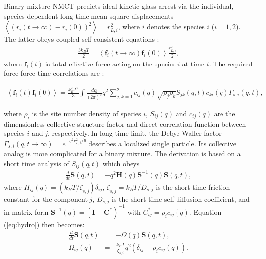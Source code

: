 \documentclass[twocolumn,showpacs,preprintnumbers,amsmath,amssymb,unsortedaddress,
]{revtex4-1}
\begin{document}
Binary mixture NMCT predicts ideal kinetic glass arrest via the individual, species-dependent long time mean-square displacements    $\left\langle (r_i(t\rightarrow \infty)-r_i(0))^2\right\rangle = r_{L,i}^2$, where $i$ denotes the species $i$ ($i=1,2$). The latter obeys coupled self-consistent equations \cite{34}:
\begin{eqnarray}
\frac{3k_BT}{2} = \left\langle \mathbf{f}_{i}(t\rightarrow \infty)\mathbf{f}_{i}(0) \right\rangle \frac{r_{L,i}^2}{2},
\label{eq:NMCT}
\end{eqnarray}
where $\mathbf{f}_{i}(t)$ is total effective force acting on the species $i$ at time $t$. The required force-force time correlations are \cite{34}:
\begin{widetext}
\begin{eqnarray}
\left\langle \mathbf{f}_{i}(t)\mathbf{f}_{i}(0) \right\rangle = \frac{k_B^2T^2}{3}\int\frac{d\mathbf{q}}{(2\pi)^3}q^2\sum_{j,k=1}^{2}c_{ij}(q)\sqrt{\rho_j\rho_k}S_{jk}(q,t)c_{ki}(q)\Gamma_{s,i}(q,t),
\label{eq:force-force}
\end{eqnarray}
\end{widetext}
where $\rho_i$ is the site number density of species $i$, $S_{ij}(q)$ and $c_{ij}(q)$ are the dimensionless collective structure factor and direct correlation function between species $i$ and $j$, respectively. In long time limit, the Debye-Waller factor $\Gamma_{s,i}(q,t\rightarrow \infty) = e^{-q^2r_{L,i}^2/6}$ describes a localized single particle. Its collective analog is more complicated for a binary mixture. The derivation is based on a short time analysis of $S_{ij}(q,t)$ which obeys \cite{34,41,42}
\begin{eqnarray}
\frac{d}{dt}\mathbf{S}(q,t) = -q^2\mathbf{H}(q)\mathbf{S}^{-1}(q)\mathbf{S}(q,t),
\label{eq:hydro}
\end{eqnarray}
where $H_{ij}(q) = (k_BT/\zeta_{s,j})\delta_{ij}$, $\zeta_{s,j} = k_BT/D_{s,j}$ is the short time friction constant for the component $j$, $D_{s,j}$ is the short time self diffusion coefficient, and in matrix form $\mathbf{S}^{-1}(q) = (\mathbf{I} - \mathbf{C}^*)^{-1}$ with $C^*_{ij} = \rho_ic_{ij}(q)$. Equation (\ref{eq:hydro}) then becomes:
\begin{eqnarray}
\frac{d}{dt}\mathbf{S}(q,t) &=& -{\Omega}(q)\mathbf{S}(q,t), \nonumber\\
\Omega_{ij}(q) &=& \frac{k_BT}{\zeta_{s,i}}q^2\left(\delta_{ij} - \rho_ic_{ij}(q) \right).
\label{eq:matrix}
\end{eqnarray}
\end{document}
